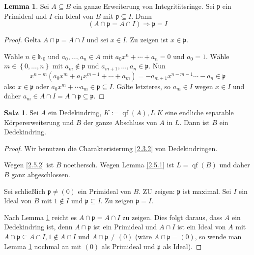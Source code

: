 \documentclass[
twoside=semi,
fontsize=12,
DIV=12, 
cleardoublepage=current,
leqno,
headings=optiontoheadandtoc, 
toc=idx
]{scrbook}
\newcommand{\N}{\mathbb{N}}
\newcommand{\set}[1]{\left\{ #1 \right\}}
\DeclareMathOperator{\qf}{qf}
\theoremstyle{definition}
\newtheorem{satz}[definition]{Satz}
\newtheorem{lemma}[definition]{Lemma}
\begin{document}
 	\begin{lemma}\label{2.5.3}
 		Sei $A \subseteq B$ ein ganze Erweiterung von Integrit\"atsringe. Sei $\mathfrak{p}$ ein Primideal und $I$ ein Ideal von $B$ mit $\mathfrak{p} \subseteq I$. Dann 
 		\[(A \cap \mathfrak{p} = A \cap I) \Rightarrow \mathfrak{p} = I\]
 		
 		\begin{proof}
 			Gelta $A \cap \mathfrak{p} = A \cap I$ und sei $x \in I$. Zu zeigen ist $x \in \mathfrak{p}$.
 			
 			W\"ahle $n \in \N_0$ und $a_0, \dots, a_n \in A$ mit $a_0x^n + \cdots + a_n = 0$ und $a_0 = 1$. W\"ahle $m \in \set{0, \dots, n}$ mit $a_m \notin \mathfrak{p}$ und $a_{m+1}, \dots, a_n \in \mathfrak{p}$. Nun 
 			\[x^{n-m}(a_0x^m + a_1x^{m-1} + \cdots + a_m) = -a_{m+1}x^{n-m-1} \cdots - a_n \in \mathfrak{p}\]
 			also $x \in \mathfrak{p}$ oder $a_0x^m + \cdots a_m \in \mathfrak{p} \subseteq I$. G\"alte letzteres, so $a_m \in I$ wegen $x \in I$ und daher $a_m \in A \cap I = A \cap \mathfrak{p} \subseteq \mathfrak{p}$.
 		\end{proof}
 	\end{lemma}
 
 	\begin{satz}\label{2.5.4}
 		Sei $A$ ein Dedekindring, $K:= \qf(A), L|K$ eine endliche separable K\"orpererweiterung und $B$ der ganze Abschluss von $A$ in $L$. Dann ist $B$ ein Dedekindring.
 		
 		\begin{proof}
 			Wir benutzen die Charakterisierung \ref{2.3.2} von Dedekindringen.
 			
 			Wegen \ref{2.5.2} ist $B$ noethersch. Wegen Lemma \ref{2.5.1} ist $L = \qf(B)$ und daher $B$ ganz abgeschlossen.
 			
 			Sei schlie\ss lich $\mathfrak{p} \neq (0)$ ein Primideal von $B$. ZU zeigen: $\mathfrak{p}$ ist maximal. Sei $I$ ein Ideal von $B$ mit $1 \notin I$ und $\mathfrak{p} \subseteq I$. Zu zeigen $\mathfrak{p} = I$.
 			
 			Nach Lemma \ref{2.5.3} reicht es $A \cap \mathfrak{p} = A \cap I$ zu zeigen. Dies folgt daraus, dass $A$ ein Dedekindring ist, denn $A \cap \mathfrak{p}$ ist ein Primideal und $A \cap I$ ist ein Ideal von $A$ mit $A \cap \mathfrak{p} \subseteq A \cap I, 1 \notin A \cap I$ und $A \cap \mathfrak{p} \neq (0)$ (w\"are $A \cap \mathfrak{p} = (0)$, so wende man Lemma \ref{2.5.3} nochmal an mit $(0)$ als Primideal und $\mathfrak{p}$ als Ideal).
 		\end{proof}
 	\end{satz}
 
\end{document}
